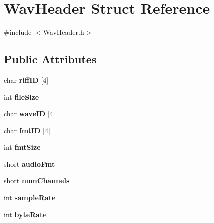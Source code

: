 \hypertarget{structWavHeader}{}\section{Wav\+Header Struct Reference}
\label{structWavHeader}


{\ttfamily \#include $<$Wav\+Header.\+h$>$}

\subsection*{Public Attributes}
\begin{DoxyCompactItemize}
\item 
\mbox{\label{structWavHeader_ae0965a20455681050284337f890e1345}} 
char {\bfseries riff\+ID} \mbox{[}4\mbox{]}
\item 
\mbox{\label{structWavHeader_a303a922a318e59a008486d200278642e}} 
int {\bfseries file\+Size}
\item 
\mbox{\label{structWavHeader_a87ded76921fcfbb0b79530a2d907e1a6}} 
char {\bfseries wave\+ID} \mbox{[}4\mbox{]}
\item 
\mbox{\label{structWavHeader_afd86c492cd7479eb92ad528757a31c1a}} 
char {\bfseries fmt\+ID} \mbox{[}4\mbox{]}
\item 
\mbox{\label{structWavHeader_a01300c585ceede02c336d7cc32eb9b43}} 
int {\bfseries fmt\+Size}
\item 
\mbox{\label{structWavHeader_ada5498f780f96cb417d2e62b4cd42c30}} 
short {\bfseries audio\+Fmt}
\item 
\mbox{\label{structWavHeader_a974f24ee8f6c0f7a6a881b1b5f917bfa}} 
short {\bfseries num\+Channels}
\item 
\mbox{\label{structWavHeader_a70f6545b7646e8f9c2f02118150566d1}} 
int {\bfseries sample\+Rate}
\item 
\mbox{\label{structWavHeader_ab9c193dd57da1a877cd5193657ed8a75}} 
int {\bfseries byte\+Rate}
\item 

\end{DoxyCompactItemize}
